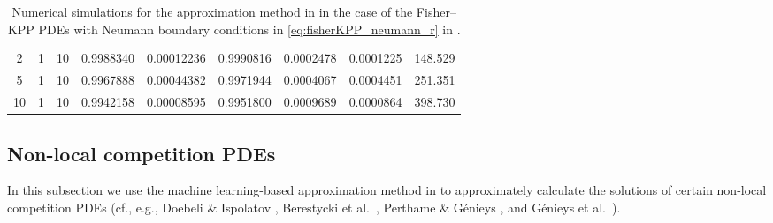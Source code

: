 \begin{table}
\begin{center}
\begin{tabular}{|c|c|c|c|c|c|c|c|c|}
			2 & 1 & 10 & 0.9988340 & 0.00012236 & 0.9990816 & 0.0002478 & 0.0001225 & 148.529\\
			5 & 1 & 10 & 0.9967888 & 0.00044382 & 0.9971944 & 0.0004067 & 0.0004451 & 251.351\\
			10 & 1 & 10 & 0.9942158 & 0.00008595 & 0.9951800 & 0.0009689 & 0.0000864 & 398.730\\
			\hline
		\end{tabular}
	\end{center}
	\caption{Numerical simulations for the approximation method in  in the case of the Fisher--KPP PDEs with Neumann boundary conditions in \eqref{eq:fisherKPP_neumann_r} in .
	\label{table:fisherKPP_neumann_r}}
\end{table}

\subsection{Non-local competition PDEs}
\label{subsec:nonlocalcompPDE}
%
In this subsection we use the machine learning-based approximation method in 
to approximately calculate the solutions of certain non-local competition PDEs (cf., e.g., Doebeli \& Ispolatov \cite{Doebeli2010}, Berestycki et al.~\cite{Berestycki2009b}, Perthame \& Génieys \cite{Perthame2007}, and Génieys et al.~\cite{Genieys2006a}).
%

